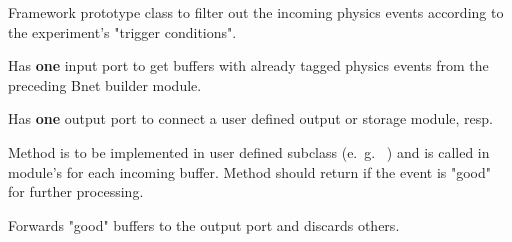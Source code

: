 \begin{description}
   Framework prototype class to filter out the incoming physics events 
   according to the experiment's "trigger conditions". 
\begin{compactenum}
  \item Has {\bf one} input port to get buffers with 
      already tagged physics events from the preceding Bnet builder module.
  \item Has {\bf one} output port to connect a user defined output or storage module, resp.
  \item Method  is to be implemented in user 
      defined subclass (e.~g.~ ) and is called in 
      module's  for each incoming buffer. 
      Method should return  if the event is "good" for further processing.
  \item Forwards "good" buffers to the output port and discards others.
\end{compactenum}
\end{description}

